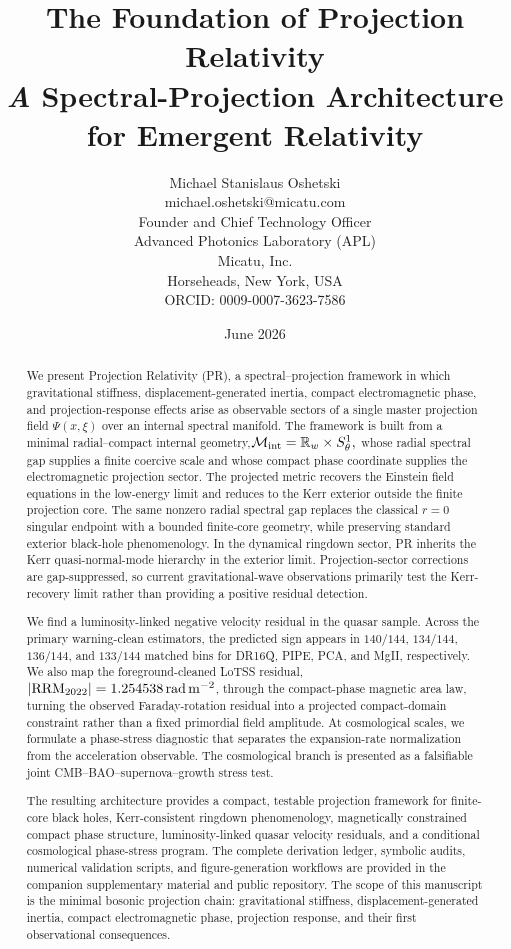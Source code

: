 \documentclass[11pt]{article}
\title{The Foundation of Projection Relativity \\
\Large \textit A Spectral-Projection Architecture for Emergent Relativity}
\author{Michael Stanislaus Oshetski \orcidlink{0009-0007-3623-7586} \\
\small {michael.oshetski@micatu.com}\\
\small Founder and Chief Technology Officer \\
\small Advanced Photonics Laboratory (APL)\\
\small Micatu, Inc. \\
\small Horseheads, New York, USA \\
\small ORCID: 0009-0007-3623-7586
\date {June 2026}}
\begin{document}
\maketitle
\begin{abstract}
We present Projection Relativity (PR), a spectral--projection framework in which gravitational stiffness, displacement-generated inertia, compact electromagnetic phase, and projection-response effects arise as observable sectors of a single master projection field \(\Psi(x,\xi)\) over an internal spectral manifold. The framework is built from a minimal radial--compact internal geometry,$\mathcal M_{\rm int}=\mathbb R_w\times S^1_\theta,$ whose radial spectral gap supplies a finite coercive scale and whose compact phase coordinate supplies the electromagnetic projection sector. The projected metric recovers the Einstein field equations in the low-energy limit and reduces to the Kerr exterior outside the finite projection core. The same nonzero radial spectral gap replaces the classical \(r=0\) singular endpoint with a bounded finite-core geometry, while preserving standard exterior black-hole phenomenology. In the dynamical ringdown sector, PR inherits the Kerr quasi-normal-mode hierarchy in the exterior limit. Projection-sector corrections are gap-suppressed, so current gravitational-wave observations primarily test the Kerr-recovery limit rather than providing a positive residual detection.

We find a luminosity-linked negative velocity residual in the quasar sample. Across the primary warning-clean estimators, the predicted sign appears in \(140/144\), \(134/144\), \(136/144\), and \(133/144\) matched bins for DR16Q, PIPE, PCA, and MgII, respectively. We also map the foreground-cleaned LoTSS residual, $|{\rm RRM}_{2022}|=1.254538\,{\rm rad\,m^{-2}}$, through the compact-phase magnetic area law, turning the observed Faraday-rotation residual into a projected compact-domain constraint rather than a fixed primordial field amplitude. At cosmological scales, we formulate a phase-stress diagnostic that separates the expansion-rate normalization from the acceleration observable. The cosmological branch is presented as a falsifiable joint CMB--BAO--supernova--growth stress test.

The resulting architecture provides a compact, testable projection framework for finite-core black holes, Kerr-consistent ringdown phenomenology, magnetically constrained compact phase structure, luminosity-linked quasar velocity residuals, and a conditional cosmological phase-stress program. The complete derivation ledger, symbolic audits, numerical validation scripts, and figure-generation workflows are provided in the companion supplementary material and public repository. The scope of this manuscript is the minimal bosonic projection chain: gravitational stiffness, displacement-generated inertia, compact electromagnetic phase, projection response, and their first observational consequences.
\end{abstract}
\end{document}
